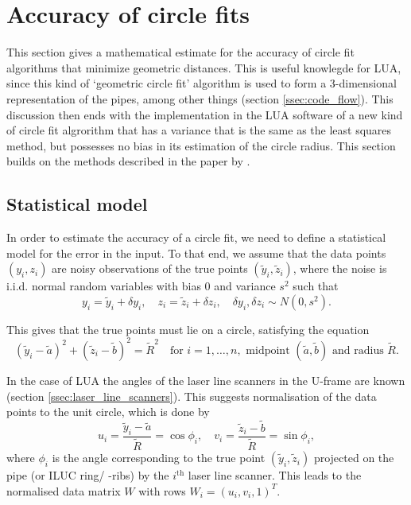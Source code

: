 \section{Accuracy of circle fits} \label{sec:accuracy}
This section gives a mathematical estimate for the accuracy of circle fit algorithms that minimize geometric distances. This is useful knowlegde for LUA, since this kind of `geometric circle fit' algorithm is used to form a 3-dimensional representation of the pipes, among other things (section \ref{ssec:code_flow}). This discussion then ends with the implementation in the LUA software of a new kind of circle fit algrorithm that has a variance that is the same as the least squares method, but possesses no bias in its estimation of the circle radius. This section builds on the methods described in the paper by \citeauthor{alsharadqah_chernov_circle_fitting} \cite{alsharadqah_chernov_circle_fitting}.

\subsection{Statistical model}\label{ssec:statistical_model}
In order to estimate the accuracy of a circle fit, we need to define a statistical model for the error in the input. To that end, we assume that the data points $(y_i, z_i)$ are noisy observations of the true points $(\tilde{y}_i, \tilde{z}_i)$, where the noise is i.i.d. normal random variables with bias 0 and variance $s^2$ \cite[section 2]{alsharadqah_chernov_circle_fitting} such that
\begin{equation}
    y_i = \tilde{y}_i + \delta y_i, \quad z_i = \tilde{z}_i + \delta z_i, \quad \delta y_i, \delta z_i \sim N(0, s^2).
\end{equation}

This gives that the true points must lie on a circle, satisfying the equation
\begin{equation}
    (\tilde{y}_i - \tilde{a})^2 + (\tilde{z}_i - \tilde{b})^2 = \tilde{R}^2 \quad \text{for } i = 1, \dots, n, \text{ midpoint } (\tilde{a}, \tilde{b}) \text{ and radius } \tilde{R}.
\end{equation}

In the case of LUA the angles of the laser line scanners in the U-frame are known (section \ref{ssec:laser_line_scanners}). This suggests normalisation of the data points to the unit circle, which is done by
\begin{equation}
    u_i = \frac{\tilde{y}_i - \tilde{a}}{\tilde{R}} = \cos{\phi_i}, \quad v_i = \frac{\tilde{z}_i - \tilde{b}}{\tilde{R}} = \sin{\phi_i},
\end{equation}
where $\phi_i$ is the angle corresponding to the true point $(\tilde{y}_i, \tilde{z}_i)$ projected on the pipe (or ILUC ring/ -ribs) by the $i^{\text{th}}$ laser line scanner. This leads to the normalised data matrix $W$ with rows $W_i = (u_i, v_i, 1)^T$.

